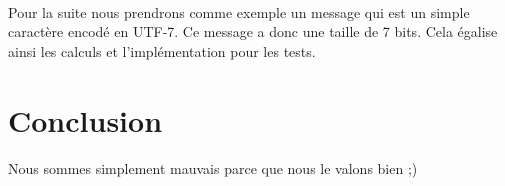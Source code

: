 \documentclass[a4paper,11pt]{report}
\begin{document}
        \paragraph{}
Pour la suite nous prendrons comme exemple un message qui est un simple caractère encodé en UTF-7.
Ce message a donc une taille de 7 bits.
Cela égalise ainsi les calculs et l'implémentation pour les tests.
    \clearpage

    
    \clearpage

    
    \clearpage

    
    \clearpage

    
    \clearpage

    \section{Conclusion}
        \paragraph{}
Nous sommes simplement mauvais parce que nous le valons bien ;)
    \clearpage

    \begin{abstract} %
    \end{abstract}
    \clearpage

    
    \clearpage

    \clearpage
\end{document}
